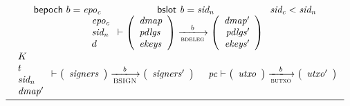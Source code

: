 \begin{figure}
  \begin{equation}
    \label{eq:rule:chain-extension}
    \inference
    { \fun{bepoch}~b = \var{epo_c}
      & \bslot{b} = \var{sid_n} 
      & \var{sid_c} < \var{sid_n} \\
      {\begin{array}{l}
         \var{epo_c}\\
         \var{sid_n}\\
         d
       \end{array}}
      \vdash
      {
        \left(
          \begin{array}{l}
            \var{dmap}\\
            \var{pdlgs}\\
            \var{ekeys}
          \end{array}
        \right)
      }
      \trans{bdeleg}{b}
      {
        \left(
          \begin{array}{r}
            \var{dmap'}\\
            \var{pdlgs'}\\
            \var{ekeys'}
          \end{array}
        \right)
      }
      \\
      {\begin{array}{l}
         K\\
         t\\
         \var{sid_n}\\
         \var{dmap'}
      \end{array}}
      \vdash
      {
        \left(
          \begin{array}{l}
            \var{signers}
          \end{array}
        \right)
      }
      \trans{BSIGN}{b}
      {
        \left(
          \begin{array}{l}
            \var{signers'}
          \end{array}
        \right)
      }      
      &
      {
        \var{pc} \vdash
        \left(
          \begin{array}{l}
            \var{utxo}\\
          \end{array}
        \right)
      }
      \trans{butxo}{b}
      {
        \left(
          \begin{array}{r}
            \var{utxo'}\\
          \end{array}
        \right)
      }
    }
    {
      {\begin{array}{l}

\end{array}}}
\end{equation}
\end{figure}
